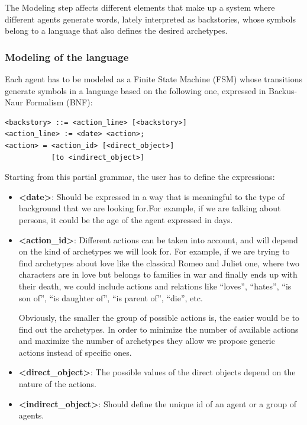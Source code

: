 \documentclass{sig-alternate}
\begin{document}
The Modeling step affects different elements that make up a system where different agents generate words, lately interpreted as backstories, whose symbols belong to a language that also defines the desired archetypes.


\subsubsection{Modeling of the language}

Each agent has to be modeled as a Finite State Machine (FSM) whose transitions generate symbols in a language based on the following one, expressed in Backus-Naur Formalism (BNF):

\begin{verbatim}
<backstory> ::= <action_line> [<backstory>]
<action_line> := <date> <action>;
<action> = <action_id> [<direct_object>]
           [to <indirect_object>]
\end{verbatim}

Starting from this partial grammar, the user has to define the expressions:
\begin{itemize}
\item \textbf{<date>}: Should be expressed in a way that is meaningful to the type of background that we are looking for.For example, if we are talking about persons, it could be the age of the agent expressed in days.

\item \textbf{<action\_id>}: Different actions can be taken into account, and will depend on the kind of archetypes we will look for. For example, if we are trying to find archetypes about love like the classical Romeo and Juliet one, where two characters are in love but belongs to families in war and finally ends up with their death, we could include actions and relations like ``loves'', ``hates'', ``is son of'', ``is daughter of'', ``is parent of'', ``die'', etc.

Obviously, the smaller the group of possible actions is, the easier would be to find out the archetypes. In order to minimize the number of available actions and maximize the number of archetypes they allow we propose generic actions instead of specific ones.

\item \textbf{<direct\_object>}: The possible values of the direct objects depend on the nature of the actions.

\item \textbf{<indirect\_object>}: Should define the unique id of an agent or a group of agents.

\end{itemize}
\end{document}
